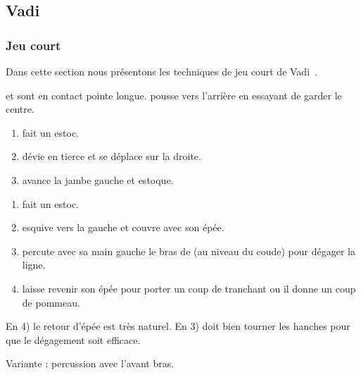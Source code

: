 \subsection{Vadi}


\subsubsection{Jeu court}


Dans cette section nous présentons les techniques de jeu court de Vadi~\cite{Vadi:Petit:2013:EpeeLongue}.


\begin{exercice}
\A et \D sont en contact pointe longue.
\A pousse \D vers l'arrière en essayant de garder le centre.

\end{exercice}


\begin{technique}

\begin{enumerate}
	\item \A fait un estoc.
	\item \D dévie en tierce et se déplace sur la droite.
	\item \D avance la jambe gauche et estoque.
\end{enumerate}
\end{technique}


\begin{technique}

\begin{enumerate}
	\item \A fait un estoc.
	\item \D esquive vers la gauche et couvre avec son épée.
	\item \D percute avec sa main gauche le bras de \A (au niveau du coude) pour dégager la ligne.
	\item \D laisse revenir son épée pour porter un coup de tranchant ou il donne un coup de pommeau.
\end{enumerate}

En 4) le retour d'épée est très naturel.
En 3) \A doit bien tourner les hanches pour que le dégagement soit efficace.

Variante : percussion avec l'avant bras.
\end{technique}


